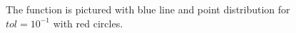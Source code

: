 \documentclass[10pt]{article}
\begin{document}
	\begin{figure}[H]
		\begin{minipage}[h]{0.5\linewidth}
			 \\
			\caption{The function is pictured with blue line and point distribution for $tol=10^{-1}$ with red circles.}
		\end{minipage}%
		\hspace{0.5cm}
		\begin{minipage}[h]{0.5\linewidth}
			 \\

\end{minipage}
\end{figure}
\end{document}
